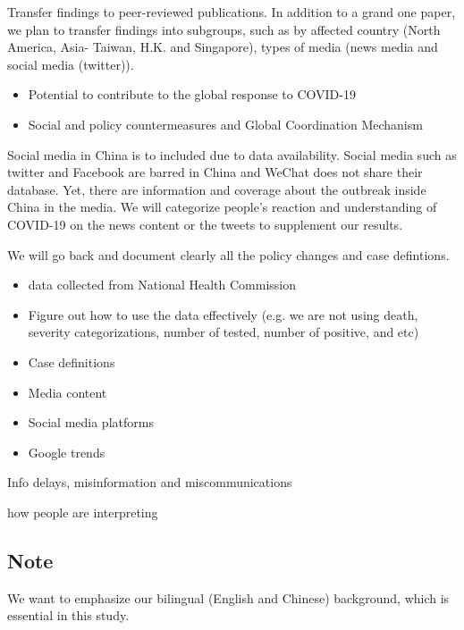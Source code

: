 





Transfer findings to peer-reviewed publications.  
In addition to a grand one paper, we plan to transfer findings into subgroups, such as by affected country (North America, Asia- Taiwan, H.K. and Singapore), types of media (news media and social media (twitter)).

\begin{itemize}
\item{Potential to contribute to the global response to COVID-19}
\item{Social and policy countermeasures and Global Coordination Mechanism}
\end{itemize}


Social media in China is to included due to data availability.   Social media such as twitter and Facebook are barred in China and WeChat does not share their database. Yet, there are information and coverage about the outbreak inside China in the media.  We will categorize people’s reaction and understanding of COVID-19  on the news content or the tweets to supplement our results.



We will go back and document clearly all the policy changes and case defintions. 

\begin{itemize}
\item{data collected from National Health Commission}
\item{Figure out how to use the data effectively (e.g. we are not using death, severity categorizations, number of tested, number of positive, and etc)}
\item{Case definitions}
\item{Media content}
\item{Social media platforms}
\item{Google trends}
\end{itemize}


Info delays, misinformation and miscommunications


how people are interpreting 


\subsection{Note}
We want to emphasize our bilingual (English and Chinese) background, which is essential in this study.

